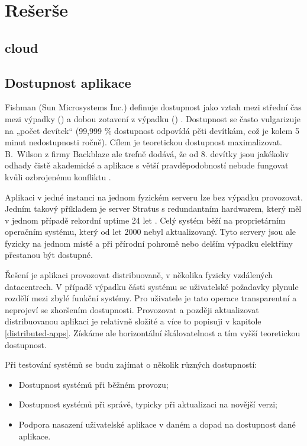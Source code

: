 \chapter{Rešerše}
    \blind[4]

    \section{cloud}
        \blind[2]

    \section{Dostupnost aplikace}
        Fishman (Sun Microsystems Inc.) definuje dostupnost jako vztah mezi střední čas mezi výpadky () a dobou zotavení z výpadku () \cite{fishman-availability}. Dostupnost se často vulgarizuje na „počet devítek“ (99,999 \% dostupnost odpovídá pěti devítkám, což je kolem 5 minut nedostupnosti ročně). Cílem je teoretickou dostupnost maximalizovat. B.~Wilson z firmy Backblaze ale trefně dodává, že od 8. devítky jsou jakékoliv odhady čistě akademické a aplikace s větší pravděpodobností nebude fungovat kvůli ozbrojenému konfliktu \cite{backblaze-availability}.

        Aplikaci v jedné instanci na jednom fyzickém serveru lze bez výpadku provozovat. Jedním takový příkladem je server Stratus s redundantním hardwarem, který měl v jednom případě rekordní uptime 24 let \cite{thibodeau-longest-uptime}. Celý systém běží na proprietárním operačním systému, který od let 2000 nebyl aktualizovaný. Tyto servery jsou ale fyzicky na jednom místě a při přírodní pohromě nebo delším výpadku elektřiny přestanou být dostupné.

        Řešení je aplikaci provozovat distribuovaně, v několika fyzicky vzdálených datacentrech. V případě výpadku části systému se uživatelské požadavky plynule rozdělí mezi zbylé funkční systémy. Pro uživatele je tato operace transparentní a neprojeví se zhoršením dostupnosti. Provozovat a později aktualizovat distribuovanou aplikaci je relativně složité a více to popisuji v kapitole \ref{distributed-apps}. Získáme ale horizontální škálovatelnost a tím vyšší teoretickou dostupnost.

        Při testování \CICD systémů se budu zajímat o několik různých dostupností:
        \begin{itemize}
            \item Dostupnost \CICD systémů při běžném provozu;
            \item Dostupnost \CICD systémů při správě, typicky při aktualizaci na novější verzi;
            \item Podpora nasazení uživatelské aplikace v daném \CICD a dopad na dostupnost dané aplikace.
        \end{itemize}

